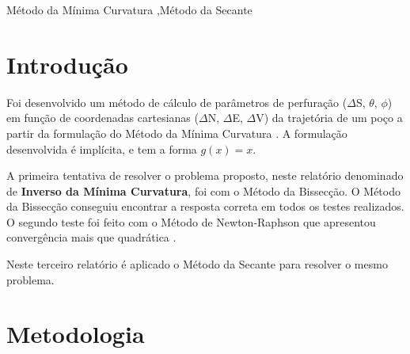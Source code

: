 \documentclass[final,5p]{elsarticle}
\numberwithin{equation}{section}
\begin{document}
\begin{frontmatter}
\begin{abstract}
\end{abstract}




\begin{keyword}
    Método da Mínima Curvatura \sep Método da Secante



\end{keyword}

\end{frontmatter}


\section{Introdução}

Foi desenvolvido um método de cálculo de parâmetros de perfuração ($\Delta$S, $\theta$, $\phi$) em função de coordenadas cartesianas ($\Delta$N, $\Delta$E, $\Delta$V) da trajetória de um poço a partir da formulação do Método da Mínima Curvatura \cite{relatoriobisseccao}. A formulação desenvolvida é implícita, e tem a forma $g(x)=x$.

A primeira tentativa de resolver o problema proposto, neste relatório denominado de \textbf{Inverso da Mínima Curvatura}, foi com o Método da Bissecção. O Método da Bissecção conseguiu encontrar a resposta correta em todos os testes realizados. O segundo teste foi feito com o Método de Newton-Raphson que apresentou convergência mais que quadrática \cite{relatorionewtonraphson}.

Neste terceiro relatório é aplicado o Método da Secante para resolver o mesmo problema.

\section{Metodologia}
\end{document}
